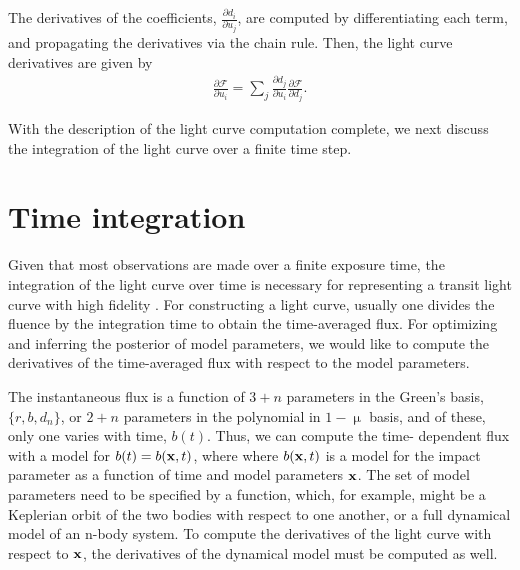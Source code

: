 \documentclass[modern]{aastex61}
\begin{document}
The derivatives of the coefficients, $\frac{\partial d_i}{\partial u_j}$, are
computed by differentiating each term, and propagating the derivatives via the
chain rule.  Then, the light curve derivatives are given by
\begin{eqnarray}
\frac{\partial \mathcal{F}}{\partial u_i} =  \sum_{j} \frac{\partial d_j}{\partial u_i}\frac{\partial \mathcal{F}}{\partial d_j}.
\end{eqnarray}

With the description of the light curve computation complete, we next discuss
the integration of the light curve over a finite time step.

\section{Time integration}

Given that most observations are made over a finite exposure time,
the integration of the light curve over time is necessary for representing
a transit light curve with high fidelity \citep{Kipping2010}.  For constructing
a light curve, usually one divides the fluence by the integration time
to obtain the time-averaged flux.  For optimizing and inferring the 
posterior of model parameters, we would like to compute the derivatives
of the time-averaged flux with respect to the model parameters.

The instantaneous flux is a function of $3+n$ parameters in the Green's basis, 
$\{r,b,d_n\}$, or $2+n$ parameters in the polynomial in $1-\upmu$ basis, and of
these, only one varies with time, $b(t)$.  Thus, we can compute the time-
dependent flux with a model for $b(t)=b({\mathbf{x}},t)$, where
where $b({\mathbf{x}},t)$ is a model for the impact parameter as a function of time
and model parameters ${\mathbf{x}}$.  The set of model parameters need to be specified
by a function, which, for example, might be a Keplerian orbit of the two bodies
with respect to one another, or a full dynamical model of an n-body system.
To compute the derivatives of the light curve with respect to ${\mathbf{x}}$, the
derivatives of the dynamical model must be computed as well.
\end{document}
